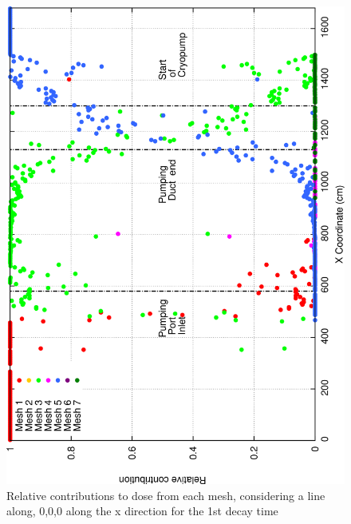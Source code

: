 \documentclass[12pt]{article}
\begin{document}
\begin{figure}[ht!]
\centering
\includegraphics[clip,scale=0.25]{../plots/crosstalk/nob4c/lp/dc1_rel.png}
\caption{Relative contributions to dose from each mesh, considering a line along, 0,0,0 along the x direction for the 1st decay time}
\label{fig:ct_lp_dc1_rel}
\end{figure}
\end{document}
